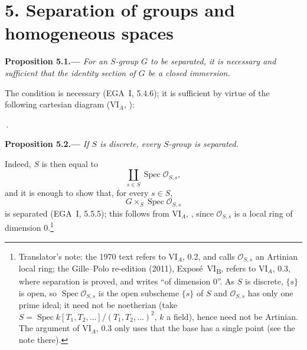 
\section*{5. Separation of groups and homogeneous spaces}
\label{sec:sga3-VIB-5}%

\medskip
{}\label{prop:sga3-VIB-5.1}%
\noindent\textbf{Proposition 5.1.---}
\emph{For an \(S\)-group \(G\) to be separated, it is necessary
and sufficient that the identity section of \(G\) be a closed
immersion.}

The condition is necessary (EGA~I, 5.4.6); it is sufficient by
virtue of the following cartesian diagram (VI\(_A\), ):
\begin{center}
  \label{diag:sga3-VIB-5.1-cartesian}%
  \,.
\end{center}

\medskip
{}\label{prop:sga3-VIB-5.2}%
\noindent\textbf{Proposition 5.2.---}
\emph{If \(S\) is discrete, every \(S\)-group is separated.}

Indeed, \(S\) is then equal to
\[
  \coprod_{s\in S}\operatorname{Spec}\mathcal O_{S,s},
\]
and it is enough to show that, for every \(s\in S\),
\[
  G\times_S\operatorname{Spec}\mathcal O_{S,s}
\]
is separated (EGA~I, 5.5.5); this follows from VI\(_A\), , since
\(\mathcal O_{S,s}\) is a local ring of dimension \(0\).\footnote{Translator's note: the 1970 text refers
to VI\(_A\), 0.2, and calls \(\mathcal O_{S,s}\) an Artinian local ring; the Gille--Polo re-edition (2011),
Expos\'e~VI\textsubscript{B}, refers to VI\(_A\), 0.3, where separation is proved, and writes ``of dimension
\(0\)''. As \(S\) is discrete, \(\{s\}\) is open, so \(\operatorname{Spec}\mathcal O_{S,s}\) is the open
subscheme \(\{s\}\) of \(S\) and \(\mathcal O_{S,s}\) has only one prime ideal; it need not be noetherian
(take \(S=\operatorname{Spec}k[T_1,T_2,\ldots]/(T_1,T_2,\ldots)^2\), \(k\) a field), hence need not be
Artinian. The argument of VI\(_A\), 0.3 only uses that the base has a single point (see the note there).}

